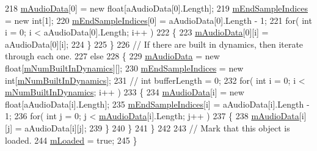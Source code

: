 \begin{DoxyCode}
218             \hyperlink{group___n_o_o_priv_var_ga842eef5bfade070f914b8a551b3bcf43}{mAudioData}[0] = \textcolor{keyword}{new} \textcolor{keywordtype}{float}[aAudioData[0].Length];
219             \hyperlink{group___n_o_o_priv_var_ga48c676306790f40714072cd6a81a0128}{mEndSampleIndices} = \textcolor{keyword}{new} \textcolor{keywordtype}{int}[1];
220             \hyperlink{group___n_o_o_priv_var_ga48c676306790f40714072cd6a81a0128}{mEndSampleIndices}[0] = aAudioData[0].Length - 1;
221             \textcolor{keywordflow}{for}( \textcolor{keywordtype}{int} i = 0; i < aAudioData[0].Length; i++ )
222             \{
223                 \hyperlink{group___n_o_o_priv_var_ga842eef5bfade070f914b8a551b3bcf43}{mAudioData}[0][i] = aAudioData[0][i];
224             \}
225         \}
226         \textcolor{comment}{// If there are built in dynamics, then iterate through each one.}
227         \textcolor{keywordflow}{else}
228         \{
229             \hyperlink{group___n_o_o_priv_var_ga842eef5bfade070f914b8a551b3bcf43}{mAudioData} = \textcolor{keyword}{new} \textcolor{keywordtype}{float}[\hyperlink{group___n_o_o_priv_var_ga3cc04564fcc1b1c4597af18e7e4fbc47}{mNumBuiltInDynamics}][];
230             \hyperlink{group___n_o_o_priv_var_ga48c676306790f40714072cd6a81a0128}{mEndSampleIndices} = \textcolor{keyword}{new} \textcolor{keywordtype}{int}[\hyperlink{group___n_o_o_priv_var_ga3cc04564fcc1b1c4597af18e7e4fbc47}{mNumBuiltInDynamics}];
231             \textcolor{comment}{// int bufferLength = 0;}
232             \textcolor{keywordflow}{for}( \textcolor{keywordtype}{int} i = 0; i < \hyperlink{group___n_o_o_priv_var_ga3cc04564fcc1b1c4597af18e7e4fbc47}{mNumBuiltInDynamics}; i++ )
233             \{
234                 \hyperlink{group___n_o_o_priv_var_ga842eef5bfade070f914b8a551b3bcf43}{mAudioData}[i] = \textcolor{keyword}{new} \textcolor{keywordtype}{float}[aAudioData[i].Length];
235                 \hyperlink{group___n_o_o_priv_var_ga48c676306790f40714072cd6a81a0128}{mEndSampleIndices}[i] = aAudioData[i].Length - 1;
236                 \textcolor{keywordflow}{for}( \textcolor{keywordtype}{int} j = 0; j < \hyperlink{group___n_o_o_priv_var_ga842eef5bfade070f914b8a551b3bcf43}{mAudioData}[i].Length; j++ )
237                 \{
238                     \hyperlink{group___n_o_o_priv_var_ga842eef5bfade070f914b8a551b3bcf43}{mAudioData}[i][j] = aAudioData[i][j];
239                 \}
240             \}
241         \}
242 
243         \textcolor{comment}{// Mark that this object is loaded. }
244         \hyperlink{group___n_o_o_priv_var_gaf01d2583555de6a523cdf82808718ca9}{mLoaded} = \textcolor{keyword}{true};
245     \}
\end{DoxyCode}
\mbox{\label{group___n_o_o_pub_func_ga7b79bbd2c7a68831b322edff140f29d2}} 
